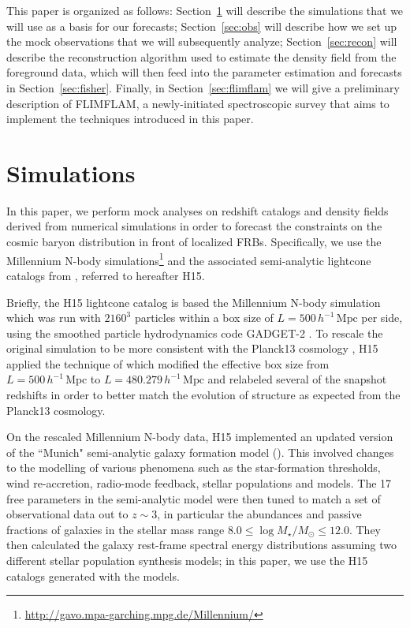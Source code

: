 \documentclass[twocolumn]{aastex63}
\newcommand{\hmpc}{\ensuremath{h^{-1}\,\mathrm{Mpc}}}
\begin{document}
\begin{CJK*}{UTF8}{gbsn}
 This paper is organized as follows: Section~\ref{sec:sims} will describe the simulations that we will use as a basis for our forecasts; 
 Section~\ref{sec:obs} will describe how we set up the mock observations that we will subsequently analyze; 
 Section~\ref{sec:recon} will describe the reconstruction algorithm used to estimate the density field from the foreground data,
 which will then feed into the parameter estimation and forecasts in Section~\ref{sec:fisher}. 
 Finally, in Section~\ref{sec:flimflam} we will give a preliminary description of FLIMFLAM, a newly-initiated spectroscopic survey that 
 aims to implement the techniques introduced in this paper.

\section{Simulations} \label{sec:sims}

In this paper, we perform mock analyses on redshift catalogs and density fields derived from numerical simulations
 in order to forecast the constraints on the cosmic baryon distribution in front of localized FRBs. Specifically, we use the Millennium N-body simulations\footnote{\url{http://gavo.mpa-garching.mpg.de/Millennium/}} \citep{springel:2005} and the associated semi-analytic lightcone catalogs from \citet{henriques:2015}, referred to hereafter H15.
 
Briefly, the H15 lightcone catalog is based the Millennium N-body simulation \citep{springel:2005}
which was run with $2160^3$ particles within a box size of $L=500\,\hmpc$ per side, using the smoothed particle hydrodynamics code GADGET-2 \citep{springel:2005a}.
To rescale the original simulation to be more consistent with the Planck13 cosmology \citep{planck-collaboration:2014}, H15 applied the technique of \citet{angulo:2015} which 
modified the effective box size from $L=500\,\hmpc$ to $L=480.279\,\hmpc$ and relabeled several of the snapshot redshifts in order to better match
the evolution of structure as expected from the Planck13 cosmology.

On the rescaled Millennium N-body data, H15 implemented an updated version of the ``Munich" semi-analytic galaxy formation model (\citealt{guo:2011}).
This involved changes to the modelling of various phenomena such as the star-formation thresholds, wind re-accretion, radio-mode feedback, stellar populations
and models. The 17 free parameters in the semi-analytic model were then tuned to match a set of observational data out to $z\sim 3$, in particular the abundances and passive fractions
of galaxies in the stellar mass range $8.0 \leq \log M_\star / M_\odot \leq 12.0$. They then calculated the galaxy rest-frame spectral energy distributions
assuming two different stellar population synthesis models; in this paper, we use the H15 catalogs generated with the \citet{maraston:2005} models. 


\end{CJK*}
\end{document}
